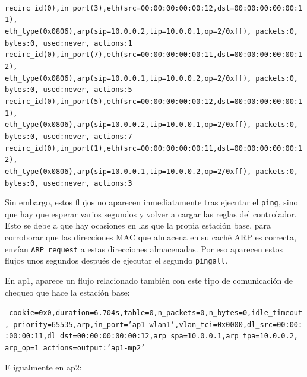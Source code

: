 \documentclass[a4paper,12pt,twoside,spanish]{book}
\begin{document}
\noindent\texttt{
	recirc\_id(0),in\_port(3),eth(src=00:00:00:00:00:12,dst=00:00:00:00:00:11),\\
	\indent eth\_type(0x0806),arp(sip=10.0.0.2,tip=10.0.0.1,op=2/0xff), packets:0,\\
	\indent bytes:0, used:never, actions:1\\
	recirc\_id(0),in\_port(7),eth(src=00:00:00:00:00:11,dst=00:00:00:00:00:12),\\
	\indent eth\_type(0x0806),arp(sip=10.0.0.1,tip=10.0.0.2,op=2/0xff), packets:0,\\
	\indent bytes:0, used:never, actions:5\\
	recirc\_id(0),in\_port(5),eth(src=00:00:00:00:00:12,dst=00:00:00:00:00:11),\\
	\indent eth\_type(0x0806),arp(sip=10.0.0.2,tip=10.0.0.1,op=2/0xff), packets:0,\\
	\indent bytes:0, used:never, actions:7\\
	recirc\_id(0),in\_port(1),eth(src=00:00:00:00:00:11,dst=00:00:00:00:00:12),\\
	\indent eth\_type(0x0806),arp(sip=10.0.0.1,tip=10.0.0.2,op=2/0xff), packets:0,\\
	\indent bytes:0, used:never, actions:3
}

Sin embargo, estos flujos no aparecen inmediatamente tras ejecutar el \texttt{ping}, sino que hay que esperar varios segundos y volver a cargar las reglas del controlador. Esto se debe a que hay ocasiones en las que la propia estación base, para corroborar que las direcciones MAC que almacena en su caché ARP es correcta, envían \texttt{ARP request} a estas direcciones almacenadas. Por eso aparecen estos flujos unos segundos después de ejecutar el segundo \texttt{pingall}.\par 

En ap1, aparece un flujo relacionado también con este tipo de comunicación de chequeo que hace la estación base:\par 

\noindent\texttt{
	cookie=0x0,duration=6.704s,table=0,n\_packets=0,n\_bytes=0,idle\_timeout\\
	, priority=65535,arp,in\_port='ap1-wlan1',vlan\_tci=0x0000,dl\_src=00:00:\\
	:00:00:11,dl\_dst=00:00:00:00:00:12,arp\_spa=10.0.0.1,arp\_tpa=10.0.0.2,\\
	\indent arp\_op=1 actions=output:'ap1-mp2'
}

E igualmente en ap2: \par
\end{document}
